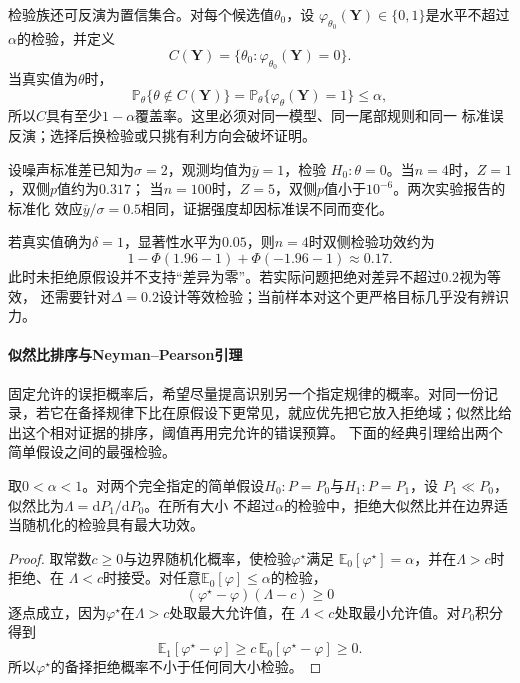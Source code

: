 检验族还可反演为置信集合。对每个候选值\(\theta_0\)，设
\(\varphi_{\theta_0}(\bm Y)\in\{0,1\}\)是水平不超过\(\alpha\)的检验，并定义
\[
  C(\bm Y)=\{\theta_0:\varphi_{\theta_0}(\bm Y)=0\}.
\]
当真实值为\(\theta\)时，
\[
  \mathbb{P}_\theta\{\theta\notin C(\bm Y)\}
  =\mathbb{P}_\theta\{\varphi_\theta(\bm Y)=1\}\leq\alpha,
\]
所以\(C\)具有至少\(1-\alpha\)覆盖率。这里必须对同一模型、同一尾部规则和同一
标准误反演；选择后换检验或只挑有利方向会破坏证明。

\begin{example}[同一效应量下的证据与功效]
\label{ex:statistics-evidence-power-same-effect}
设噪声标准差已知为\(\sigma=2\)，观测均值为\(\overline y=1\)，检验
\(H_0:\theta=0\)。当\(n=4\)时，\(Z=1\)，双侧\(p\)值约为\(0.317\)；
当\(n=100\)时，\(Z=5\)，双侧\(p\)值小于\(10^{-6}\)。两次实验报告的标准化
效应\(\overline y/\sigma=0.5\)相同，证据强度却因标准误不同而变化。

若真实值确为\(\delta=1\)，显著性水平为\(0.05\)，则\(n=4\)时双侧检验功效约为
\[
  1-\Phi(1.96-1)+\Phi(-1.96-1)\approx0.17.
\]
此时未拒绝原假设并不支持“差异为零”。若实际问题把绝对差异不超过\(0.2\)视为等效，
还需要针对\(\Delta=0.2\)设计等效检验；当前样本对这个更严格目标几乎没有辨识力。
\end{example}

\paragraph{似然比排序与Neyman–Pearson引理}
固定允许的误拒概率后，希望尽量提高识别另一个指定规律的概率。对同一份记录，若它在备择规律下比在原假设下更常见，就应优先把它放入拒绝域；似然比给出这个相对证据的排序，阈值再用完允许的错误预算。
下面的经典引理给出两个简单假设之间的最强检验。
\begin{theorem}
\label{thm:statistics-neyman-pearson}
取\(0<\alpha<1\)。对两个完全指定的简单假设\(H_0:P=P_0\)与\(H_1:P=P_1\)，设
\(P_1\ll P_0\)，似然比为\(\Lambda=\mathrm dP_1/\mathrm dP_0\)。在所有大小
不超过\(\alpha\)的检验中，拒绝大似然比并在边界适当随机化的检验具有最大功效。
\end{theorem}

\begin{proof}
取常数\(c\geq0\)与边界随机化概率，使检验\(\varphi^\star\)满足
\(\mathbb{E}_0[\varphi^\star]=\alpha\)，并在\(\Lambda>c\)时拒绝、在
\(\Lambda<c\)时接受。对任意\(\mathbb{E}_0[\varphi]\leq\alpha\)的检验，
\[
  (\varphi^\star-\varphi)(\Lambda-c)\geq0
\]
逐点成立，因为\(\varphi^\star\)在\(\Lambda>c\)处取最大允许值，在
\(\Lambda<c\)处取最小允许值。对\(P_0\)积分得到
\[
  \mathbb{E}_1[\varphi^\star-\varphi]
  \geq c\,\mathbb{E}_0[\varphi^\star-\varphi]\geq0.
\]
所以\(\varphi^\star\)的备择拒绝概率不小于任何同大小检验。
\end{proof}

